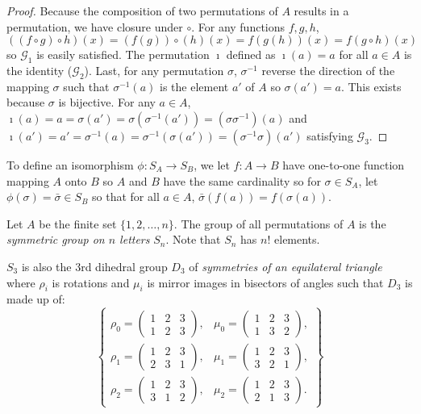 \begin{proof}
    Because the composition of two permutations of $A$ results in a permutation, we have closure under $\circ$. For any functions $f,g,h$, $((f\circ g)\circ h)(x) = (f(g))\circ(h)(x) = f(g(h))(x) = f(g\circ h)(x)$ so $\mathscr{G}_1$ is easily satisfied. The permutation $\imath$ defined as $\imath(a)=a$ for all $a \in A$ is the identity ($\mathscr{G}_2$). Last, for any permutation $\sigma$, $\sigma^{-1}$ reverse the direction of the mapping $\sigma$ such that $\sigma^{-1}(a)$ is the element $a'$ of $A$ so $\sigma(a')=a$. This exists because $\sigma$ is bijective. For any $a \in A$, $\imath(a) = a = \sigma(a') = \sigma(\sigma^{-1}(a')) = (\sigma\sigma^{-1})(a)$ and $\imath(a') = a' = \sigma^{-1}(a) = \sigma^{-1}(\sigma(a')) = (\sigma^{-1}\sigma)(a')$ satisfying $\mathscr{G}_3.$
\end{proof}
\begin{remark}
    To define an isomorphism $\phi\colon S_A \to S_B$, we let $f \colon A \to B$ have one-to-one function mapping $A$ onto $B$ so $A$ and $B$ have the same cardinality so for $\sigma \in S_A$, let $\phi(\sigma) = \bar{\sigma}\in S_B$ so that for all $a \in A$, $\bar{\sigma}(f(a)) = f(\sigma(a)).$ 
\end{remark}
\begin{definition}
    Let $A$ be the finite set $\{1,2,\dots,n\}$. The group of all permutations of $A$ is the \emph{symmetric group on $n$ letters} $S_n$. Note that $S_n$ has $n!$ elements.
\end{definition}
\begin{remark}
    $S_3$ is also the 3rd dihedral group $D_3$ of \emph{symmetries of an equilateral triangle} where $\rho_i$ is rotations and $\mu_i$ is mirror images in bisectors of angles such that $D_3$ is made up of:
    \[
    \begin{Bmatrix}
        \rho_0 = \begin{pmatrix} 1 & 2 & 3 \\ 1 & 2 & 3 \end{pmatrix}, &
        \mu_0 = \begin{pmatrix} 1 & 2 & 3 \\ 1 & 3 & 2 \end{pmatrix}, \\
        \rho_1 = \begin{pmatrix} 1 & 2 & 3 \\ 2 & 3 & 1 \end{pmatrix}, &
        \mu_1 = \begin{pmatrix} 1 & 2 & 3 \\ 3 & 2 & 1 \end{pmatrix}, \\
        \rho_2 = \begin{pmatrix} 1 & 2 & 3 \\ 3 & 1 & 2 \end{pmatrix}, &
        \mu_2 = \begin{pmatrix} 1 & 2 & 3 \\ 2 & 1 & 3 \end{pmatrix}.        
    \end{Bmatrix}
    \]
\end{remark}
